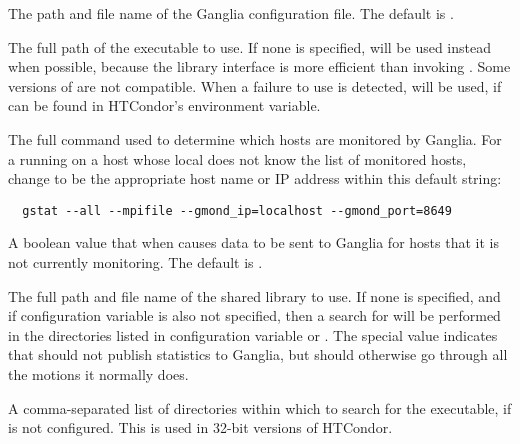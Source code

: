 \begin{description}
\label{param:GangliaConfig}
\item[\Macro{GANGLIA\_CONFIG}]
  The path and file name of the Ganglia configuration file.  
  The default is .

\label{param:GangliaGmetric}
\item[\Macro{GANGLIA\_GMETRIC}]
  The full path of the  executable to use.  If none is
  specified,  will be used instead when possible,
  because the library interface is more efficient than invoking
  .  Some versions of  are not
  compatible.  When a failure to use  is detected,
   will be used, if  can be found in HTCondor's
   environment variable.

\label{param:GangliaGstatCommand}
\item[\Macro{GANGLIA\_GSTAT\_COMMAND}]
  The full  command used to determine which hosts are monitored
  by Ganglia.
  For a  running on a host whose local  does
  not know the list of monitored hosts, change  to be
  the appropriate host name or IP address within this default string:
\footnotesize
\begin{verbatim}
  gstat --all --mpifile --gmond_ip=localhost --gmond_port=8649
\end{verbatim}
\normalsize

\label{param:GangliaSendDataForAllHosts}
\item[\Macro{GANGLIA\_SEND\_DATA\_FOR\_ALL\_HOSTS}]
  A boolean value that when  causes data to be sent to Ganglia 
  for hosts that it is not currently monitoring.
  The default is .

\label{param:GangliaLib}
\item[\Macro{GANGLIA\_LIB}]
  The full path and file name of the  shared library to use.
  If none is specified, 
  and if configuration variable  is also not specified,
  then a search for  will be performed in the 
  directories listed
  in configuration variable  or 
  .
  The special value  indicates that  should not
  publish statistics to Ganglia, but should otherwise go through all
  the motions it normally does.

\label{param:GangliaLibPath}
\item[\Macro{GANGLIA\_LIB\_PATH}]
  A comma-separated list of directories within which to search for 
  the  executable, if  is not configured.
  This is used in 32-bit versions of HTCondor.


\end{description}
